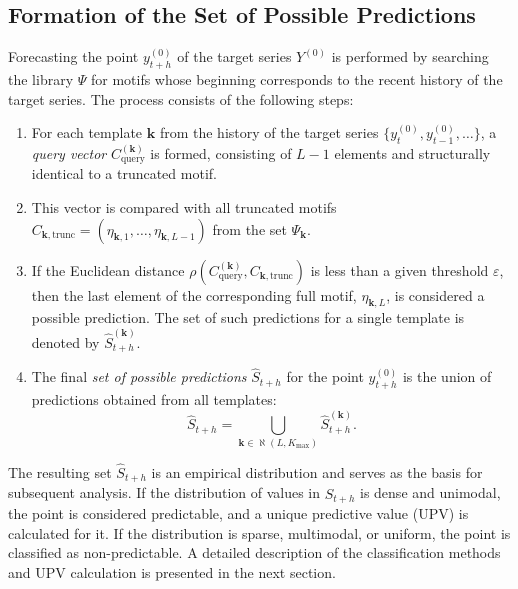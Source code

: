 \documentclass[a4paper,12pt]{extarticle}
\begin{document}
\subsection{Formation of the Set of Possible Predictions}

Forecasting the point $y_{t+h}^{(0)}$ of the target series $Y^{(0)}$
 is performed by searching the library $\Psi$ for motifs whose beginning
  corresponds to the recent history of the target series. The process consists of the following steps:
\begin{enumerate}
    \item For each template $\boldsymbol{k}$ from the history of the target
     series $\{y_{t}^{(0)}, y_{t-1}^{(0)}, \dots\}$, a \textit{query vector}
      $C_{\text{query}}^{(\boldsymbol{k})}$ is formed, consisting of $L-1$ elements
       and structurally identical to a truncated motif.

    \item This vector is compared with all truncated motifs $C_{\boldsymbol{k},
     \text{trunc}} = (\eta_{\boldsymbol{k},1}, \dots, \eta_{\boldsymbol{k}, L-1})$
     from the set $\Psi_{\boldsymbol{k}}$.

    \item If the Euclidean distance $\rho(C_{\text{query}}^{(\boldsymbol{k})},
     C_{\boldsymbol{k}, \text{trunc}})$ is less than a given threshold $\varepsilon$,
      then the last element of the corresponding full motif, $\eta_{\boldsymbol{k},L}$,
       is considered a possible prediction. The set of such predictions for a single template
       is denoted by $\hat{S}_{t+h}^{(\boldsymbol{k})}$.

    \item The final \textit{set of possible predictions} $\hat{S}_{t+h}$ for
     the point $y_{t+h}^{(0)}$ is the union of predictions obtained from all templates:
    \[
    \hat{S}_{t+h} = \bigcup_{\boldsymbol{k} \in \aleph(L, K_{\max})} \hat{S}_{t+h}^{(\boldsymbol{k})}.
    \]
\end{enumerate}

The resulting set $\hat{S}_{t+h}$ is an empirical distribution and serves as
 the basis for subsequent analysis. If the distribution of values in $\hat{S}_{t+h}$
  is dense and unimodal, the point is considered predictable, and a
  unique predictive value (UPV) is calculated for it. If the distribution is sparse,
   multimodal, or uniform, the point is classified as non-predictable.
    A detailed description of the classification methods and UPV calculation is presented in the next section.
\end{document}
